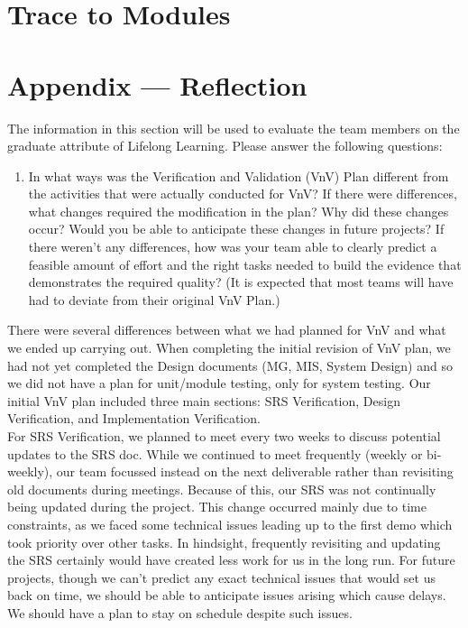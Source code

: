 \documentclass[12pt, titlepage]{article}
\begin{document}
\section{Trace to Modules}		




\newpage{}
\section*{Appendix --- Reflection}

The information in this section will be used to evaluate the team members on the
graduate attribute of Lifelong Learning.  Please answer the following questions:

\begin{enumerate}
  \item In what ways was the Verification and Validation (VnV) Plan different
  from the activities that were actually conducted for VnV?  If there were
  differences, what changes required the modification in the plan?  Why did
  these changes occur?  Would you be able to anticipate these changes in future projects?  If there weren't any differences, how was your team able to clearly predict a feasible amount of effort and the right tasks needed to build the evidence that demonstrates the required quality?  (It is expected that most teams will have had to deviate from their original VnV Plan.)
\end{enumerate}

\indent There were several differences between what we had planned for VnV and what we ended up carrying out. When completing the initial revision of VnV plan, we had not yet completed the Design documents (MG, MIS, System Design) and so we did not have a plan for unit/module testing, only for system testing. Our initial VnV plan included three main sections: SRS Verification, Design Verification, and Implementation Verification.\\

\indent For SRS Verification, we planned to meet every two weeks to discuss potential updates to the SRS doc. While we continued to meet frequently (weekly or bi-weekly), our team focussed instead on the next deliverable rather than revisiting old documents during meetings. Because of this, our SRS was not continually being updated during the project. This change occurred mainly due to time constraints, as we faced some technical issues leading up to the first demo which took priority over other tasks. In hindsight, frequently revisiting and updating the SRS certainly would have created less work for us in the long run. For future projects, though we can't predict any exact technical issues that would set us back on time, we should be able to anticipate issues arising which cause delays. We should have a plan to stay on schedule despite such issues. \\
\end{document}
